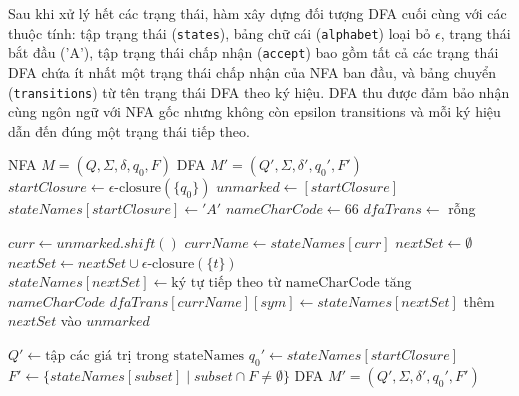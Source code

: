 \documentclass[12pt,a4paper]{report}
\begin{document}
Sau khi xử lý hết các trạng thái, hàm xây dựng đối tượng DFA cuối cùng với các thuộc tính: tập trạng thái (\texttt{states}), bảng chữ cái (\texttt{alphabet}) loại bỏ \(\epsilon\), trạng thái bắt đầu ('A'), tập trạng thái chấp nhận (\texttt{accept}) bao gồm tất cả các trạng thái DFA chứa ít nhất một trạng thái chấp nhận của NFA ban đầu, và bảng chuyển (\texttt{transitions}) từ tên trạng thái DFA theo ký hiệu. DFA thu được đảm bảo nhận cùng ngôn ngữ với NFA gốc nhưng không còn epsilon transitions và mỗi ký hiệu dẫn đến đúng một trạng thái tiếp theo.
\begin{algorithm}[H]
\caption{Chuyển NFA sang DFA bằng thuật toán tập con}
\begin{algorithmic}[1]
\Require NFA $M = (Q, \Sigma, \delta, q_0, F)$
\Ensure DFA $M' = (Q', \Sigma, \delta', q_0', F')$
\State $startClosure \gets \epsilon\text{-closure}(\{q_0\})$
\State $unmarked \gets [startClosure]$
\State $stateNames[startClosure] \gets 'A'$
\State $nameCharCode \gets 66$
\State $dfaTrans \gets$ rỗng

    \State $curr \gets unmarked.shift()$
    \State $currName \gets stateNames[curr]$
        \State $nextSet \gets \emptyset$
                    \State $nextSet \gets nextSet \cup \epsilon\text{-closure}(\{t\})$
                \EndFor
            \EndIf
        \EndFor
                \State $stateNames[nextSet] \gets \text{ký tự tiếp theo từ nameCharCode}$
                \State tăng $nameCharCode$
            \EndIf
            \State $dfaTrans[currName][sym] \gets stateNames[nextSet]$
                \State thêm $nextSet$ vào $unmarked$
            \EndIf
        \EndIf
    \EndFor
\EndWhile

\State $Q' \gets \text{tập các giá trị trong stateNames}$
\State $q_0' \gets stateNames[startClosure]$
\State $F' \gets \{ stateNames[subset] \mid subset \cap F \neq \emptyset \}$
\State \Return DFA $M' = (Q', \Sigma, \delta', q_0', F')$
\end{algorithmic}
\end{algorithm}
\end{document}
